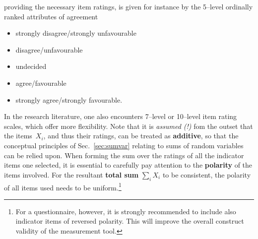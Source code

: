 providing the necessary item ratings, is given for instance by the 
5--level ordinally ranked attributes of agreement\\[-5mm]
%
\begin{itemize}
\item[1:] strongly disagree/strongly unfavourable\\[-5mm]
\item[2:] disagree/unfavourable\\[-5mm]
\item[3:] undecided\\[-5mm]
\item[4:] agree/favourable\\[-5mm]
\item[5:] strongly agree/strongly favourable.\\[-5mm]
\end{itemize}
%
In the research literature, one also encounters 7--level or 
10--level item rating scales, which offer more flexibility. Note 
that it is \textit{assumed (!)} fom the outset that the
items~$X_{i}$, and thus their ratings, can be treated as
\textbf{additive}, so that the conceptual principles of
Sec.~\ref{sec:sumvar} relating to 
sums of random variables can be relied upon. When forming the sum 
over the ratings of all the indicator items one selected, it is 
essential to carefully pay attention to the \textbf{polarity} of
the items involved. For the resultant \textbf{total sum} 
${\displaystyle\sum_{i}X_{i}}$ to be consistent, the polarity of 
all items used needs to be uniform.\footnote{For a questionnaire, 
however, it is strongly recommended to include also indicator 
items of reversed polarity. This will improve the overall 
construct validity of the measurement tool.}

